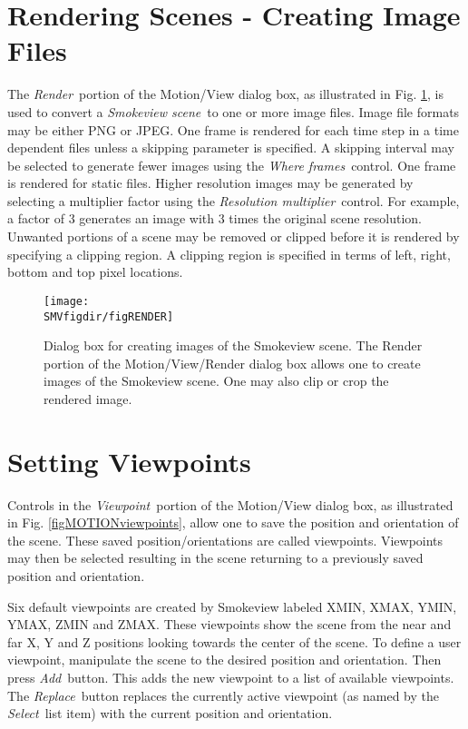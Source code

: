\documentclass[11pt,twoside]{book}
\begin{document}
\section{Rendering Scenes - Creating Image Files}
The {\em Render}\ portion of the Motion/View dialog box,
as illustrated in Fig. \ref{figMOTIONrender}, is used to convert a {\em Smokeview scene}\ to one or more image files.  Image file formats may be either PNG or JPEG. One frame is rendered for each time step in a time dependent files unless a skipping parameter is specified.
A skipping interval may be selected to generate fewer images using the {\em Where frames}\ control.  One frame is rendered for static files.  Higher resolution images may be generated by selecting a multiplier factor using the {\em Resolution multiplier}\ control. For example, a factor of 3 generates an image with 3 times the original scene resolution.  Unwanted portions of a scene may be removed or clipped before it is rendered by specifying a clipping region. A clipping region is specified in terms of left, right, bottom and top pixel locations.

\begin{figure}[bph]
\begin{center}
\texttt{[image: \\SMVfigdir/figRENDER]}
\caption[Dialog box for creating images of the Smokeview scene.]
{Dialog box for creating images of the Smokeview scene. The Render portion of the Motion/View/Render dialog box allows one to create images of the Smokeview scene. One may also clip or crop the rendered image.}
\label{figMOTIONrender}
\end{center}
\end{figure}

\section{Setting Viewpoints}
Controls in the {\em Viewpoint}\ portion of the Motion/View dialog box, as
illustrated in Fig. \ref{figMOTIONviewpoints}, allow one to save the position and orientation of the scene.  These saved position/orientations are called viewpoints.  Viewpoints may then be selected resulting in the scene returning to a previously saved position and orientation.

Six default viewpoints are created by Smokeview labeled XMIN, XMAX, YMIN, YMAX, ZMIN and ZMAX.  These viewpoints show the scene from the near and far X, Y and Z positions looking towards the center of the scene.  To define a user viewpoint, manipulate the scene to the desired position and orientation. Then press
{\em Add}\ button.  This adds the new viewpoint to a list of available viewpoints.
The {\em Replace}\ button replaces the currently active viewpoint (as named by the {\em Select}\ list item) with the current position and orientation.
\end{document}
